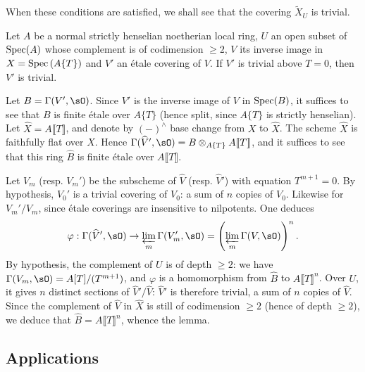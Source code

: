 When these conditions are satisfied, we shall see that the covering
$\widetilde X_U$ is trivial. 





\begin{lemma}\label{I:5-2-7} %
Let $A$ be a normal strictly henselian noetherian local ring, $U$
an open subset of $\operatorname{Spec}(A)$ whose complement is of codimension $\geqslant 2$,
$V$ its inverse image in $X=\operatorname{Spec}\left(A\{T\}\right)$ and $V'$ an
\'etale covering of $V$. If $V'$ is trivial above $T=0$, then $V'$
is trivial.
\end{lemma}

Let $B=\Gamma(V',\sO)$. Since $V'$ is the inverse image of $V$ in
$\operatorname{Spec}(B)$, it suffices to see that $B$ is finite \'etale over $A\{T\}$
(hence split, since $A\{T\}$ is strictly henselian). Let
$\widehat X=A\llbracket T\rrbracket$, and denote by $(-)^\wedge$ base change
from $X$ to $\widehat X$. The scheme $\widehat X$ is faithfully flat
over $X$. Hence
$\Gamma(\widehat V',\sO) = B\otimes_{A\{T\}} A\llbracket T\rrbracket$, and it
suffices to see that this ring $\widehat B$ is finite \'etale over
$A\llbracket T\rrbracket$.

Let $V_m$ (resp. $V_m'$) be the subscheme of $\widehat V$ (resp. $\widehat V'$)
with equation $T^{m+1} = 0$. By hypothesis, $V_0'$ is a trivial covering
of $V_0$: a sum of $n$ copies of $V_0$. Likewise for $V_m'/V_m$, since
\'etale coverings are insensitive to nilpotents. One deduces
\[
  \varphi : \Gamma(\widehat V',\sO) \to \varprojlim_m \Gamma(V_m',\sO) = \left(\varprojlim_m \Gamma(V,\sO)\right)^n \text{.}
\]
By hypothesis, the complement of $U$ is of depth $\geqslant 2$: we have
$\Gamma(V_m,\sO)=A[T]/(T^{m+1})$, and $\varphi$ is a homomorphism from
$\widehat B$ to $A\llbracket T\rrbracket^n$. Over $U$, it gives $n$
distinct sections of $\widehat V'/\widehat V$: $\widehat V'$ is therefore
trivial, a sum of $n$ copies of $\widehat V$. Since the complement of
$\widehat V$ in $\widehat X$ is still of codimension $\geqslant 2$ (hence of
depth $\geqslant 2$), we deduce that $\widehat B=A\llbracket T\rrbracket^n$,
whence the lemma. 










\subsection{Applications}\label{I:5-3}





